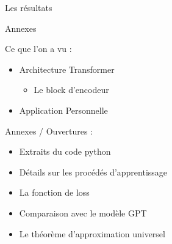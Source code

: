 \documentclass[12pt]{beamer}
\begin{document}
\begin{frame}{Les résultats}


\end{frame}




\begin{frame}{Annexes}

\begin{multicols*}[2][]

Ce que l'on a vu : 

\begin{itemize}
	\item Architecture Transformer
	\begin{itemize}
		\item Le block d'encodeur
	\end{itemize}
	\item Application Personnelle
\end{itemize}

\columnbreak

Annexes / Ouvertures :

\begin{itemize}
	\item Extraits du code python
	\item Détails sur les procédés d'apprentissage
	\item La fonction de loss
	\item Comparaison avec le modèle GPT
	\item Le théorème d'approximation universel
\end{itemize}


\end{multicols*}

\end{frame}
\end{document}
